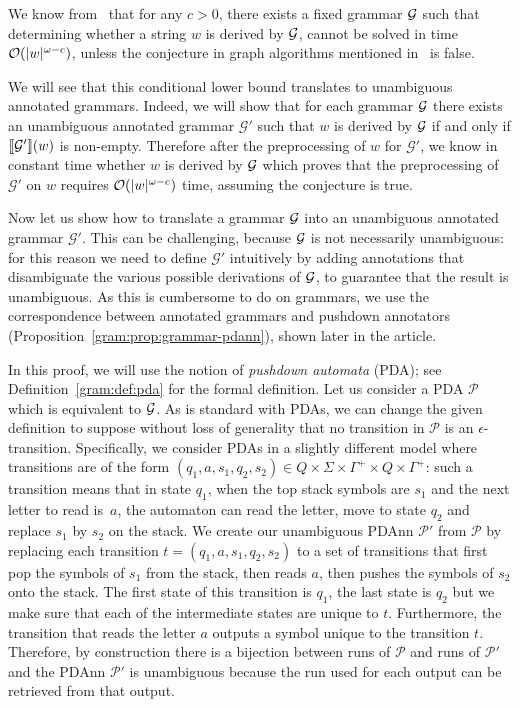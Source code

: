 %

We know from~\cite{AbboudBW18} that for any $c>0$, there exists a fixed
grammar $\mathcal{G}$ such that determining whether a string $w$ is
derived by $\mathcal{G}$, cannot be solved in time $\mathcal{O}(|w|^{\omega-c})$, unless the conjecture in graph algorithms mentioned in~\cite{AbboudBW18} is false.


We will see that this conditional lower bound translates to unambiguous
annotated grammars. Indeed, we will show that for each grammar
$\mathcal{G}$ there exists an unambiguous annotated grammar
$\mathcal{G}'$ such that $w$ is derived by $\mathcal{G}$ if and only
if ${\llbracket{\mathcal{G}'}\rrbracket}(w)$ is non-empty. Therefore after the
preprocessing of $w$ for $\mathcal{G}'$, we know in constant time
whether $w$ is derived by $\mathcal{G}$ which proves that the
preprocessing of $\mathcal{G}'$ on $w$ requires $\mathcal{O}(|w|^{\omega-c})$
time, assuming the conjecture is true.

Now let us show how to translate a grammar $\mathcal{G}$ into an
unambiguous annotated grammar $\mathcal{G}'$. This can be challenging, because
$\mathcal{G}$ is not necessarily unambiguous: for this reason we need to define
$\mathcal{G}'$ intuitively by adding annotations that disambiguate the various
possible derivations of $\mathcal{G}$, to guarantee that the result is
unambiguous. As this is cumbersome to do on grammars, we use the
correspondence between annotated grammars and pushdown annotators
(Proposition~\ref{gram:prop:grammar-pdann}), shown later in the article. 

In this proof, we will use the notion of \emph{pushdown automata} (PDA); see
Definition~\ref{gram:def:pda} for the formal definition.
Let us consider a PDA $\mathcal{P}$ 
which is equivalent to $\mathcal{G}$.
As is standard with PDAs, we can change the given definition to suppose without
loss of generality that no transition in $\mathcal{P}$ is an
$\epsilon$-transition. Specifically, we consider PDAs in a slightly different
model where transitions 
are of the form
$(q_1,a,s_1,q_2,s_2)\in Q\times \Sigma \times \Gamma^+ \times
Q \times \Gamma^+$: such a transition means that in state $q_1$, when the top
stack symbols are $s_1$ and the next letter to read is~$a$, the automaton can
read the letter, move to state
$q_2$ and replace $s_1$ by $s_2$ on the stack. We create our
unambiguous PDAnn $\mathcal{P}'$ from $\mathcal{P}$ by replacing
each transition $t=(q_1,a,s_1,q_2,s_2)$ to a set of transitions that
first pop the symbols of $s_1$ from the stack, then reads $a$, then
pushes the symbols of $s_2$ onto the stack. The first state of this
transition is $q_1$, the last state is $q_2$ but we make sure that
each of the intermediate states are unique to $t$. Furthermore, the
transition that reads the letter $a$ outputs a symbol unique to the
transition $t$. Therefore, by construction there is a bijection
between runs of $\mathcal{P}$ and runs of $\mathcal{P}'$ and the 
PDAnn $\mathcal{P}'$ is unambiguous because the run used for each
output can be retrieved from that output.

